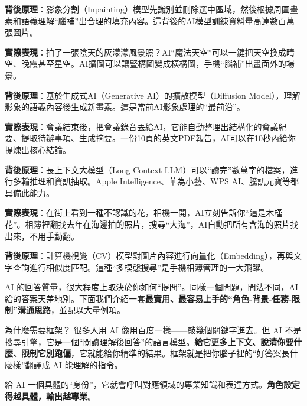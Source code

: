 \textbf{背後原理}：影象分割（Inpainting）模型先識別並刪除選中區域，然後根據周圍畫素和語義理解“腦補”出合理的填充內容。這背後的AI模型訓練資料量高達數百萬張圖片。


\textbf{實際表現}：拍了一張陰天的灰濛濛風景照？AI“魔法天空”可以一鍵把天空換成晴空、晚霞甚至星空。AI擴圖可以讓豎構圖變成橫構圖，手機“腦補”出畫面外的場景。

\textbf{背後原理}：基於生成式AI（Generative AI）的擴散模型（Diffusion Model），理解影象的語義內容後生成新畫素。這是當前AI影象處理的“最前沿”。


\textbf{實際表現}：會議結束後，把會議錄音丟給AI，它能自動整理出結構化的會議紀要、提取待辦事項、生成摘要。一份10頁的英文PDF報告，AI可以在10秒內給你提煉出核心結論。

\textbf{背後原理}：長上下文大模型（Long Context LLM）可以“讀完”數萬字的檔案，進行多輪推理和資訊抽取。Apple Intelligence、華為小藝、WPS AI、騰訊元寶等都具備此能力。


\textbf{實際表現}：在街上看到一種不認識的花，相機一開，AI立刻告訴你“這是木槿花”。相簿裡翻找去年在海邊拍的照片，搜尋“大海”，AI自動把所有含海的照片找出來，不用手動翻。

\textbf{背後原理}：計算機視覺（CV）模型對圖片內容進行向量化（Embedding），再與文字查詢進行相似度匹配。這種“多模態搜尋”是手機相簿管理的一大飛躍。


AI 的回答質量，很大程度上取決於你如何“提問”。同樣一個問題，問法不同，AI 給的答案天差地別。下面我們介紹一套\textbf{最實用、最容易上手的“角色-背景-任務-限制”溝通思路}，並配以大量例項。

\begin{tcbinfo}{為什麼需要框架？}
很多人用 AI 像用百度一樣——敲幾個關鍵字進去。但 AI 不是搜尋引擎，它是一個“閱讀理解後回答”的語言模型。\textbf{給它更多上下文、說清你要什麼、限制它別跑偏}，它就能給你精準的結果。框架就是把你腦子裡的“好答案長什麼樣”翻譯成 AI 能理解的指令。

\end{tcbinfo}


給 AI 一個具體的“身份”，它就會呼叫對應領域的專業知識和表達方式。\textbf{角色設定得越具體，輸出越專業}。

